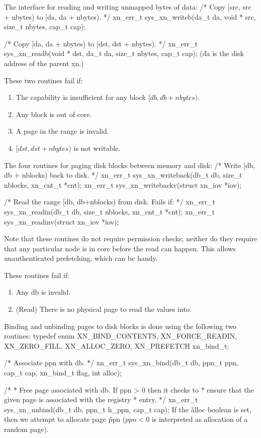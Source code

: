 The interface for reading and writing unmapped bytes of data:
/* Copy [src, src + nbytes) to [da, da + nbytes).  */
xn_err_t sys_xn_writeb(da_t da, void * src, size_t nbytes, cap_t cap);

/* Copy [da, da + nbytes) to [dst, dst + nbytes).  */
xn_err_t sys_xn_readb(void * dst, da_t da, size_t nbytes, cap_t cap);
(\v{da} is the disk address of the parent xn.)

These two routines fail if:
\begin{enumerate}
 	\item The capability is insufficient for any block $[db, db + nbytes)$.
 	\item Any block is out of core.
 	\item A page in the range is invalid.
 	\item $[dst, dst + nbytes)$ is not writable.
\end{enumerate}


The four routines for paging disk blocks between memory and disk:
/* Write [db, db + nblocks) back to disk.  */
xn_err_t sys_xn_writeback(db_t db, size_t nblocks, xn_cnt_t *cnt);
xn_err_t sys_xn_writebackv(struct xn_iov *iov);

/* Read the range [db, db+nblocks) from disk.  Fails if: */
xn_err_t sys_xn_readin(db_t db, size_t nblocks, xn_cnt_t *cnt);
xn_err_t sys_xn_readinv(struct xn_iov *iov);

Note that these routines do not require permission checks; neither do
they require that any particular node is in core before the
read can happen.  This allows unauthenticated prefetching, which
can be handy.

These routines fail if:
\begin{enumerate}
 	\item Any db is invalid.
	\item (Read) There is no physical page to read the values into.
\end{enumerate}

Binding and unbinding pages to disk blocks is done using the following two
routines:
typedef enum { 
	XN_BIND_CONTENTS, 
	XN_FORCE_READIN, 
	XN_ZERO_FILL, 
	XN_ALLOC_ZERO, 
	XN_PREFETCH
} xn_bind_t;

/* Associate ppn with db. */
xn_err_t sys_xn_bind(db_t db, ppn_t ppn, cap_t cap, xn_bind_t flag, int alloc);

/*
 * Free page associated with db.  If ppn > 0 then it checks to
 * ensure that the given page is associated with the registry
 * entry.
 */
xn_err_t sys_xn_unbind(db_t db, ppn_t h_ppn, cap_t cap);
If the \v{alloc} boolean is set, then we attempt to allocate page
\v{ppn} ($ppn < 0$ is interpreted as allocation of a random page).

